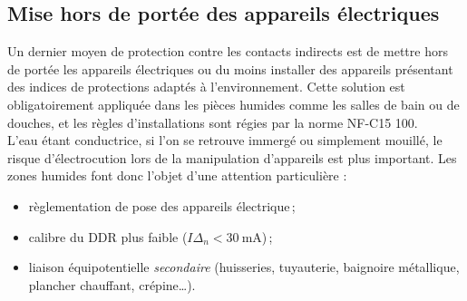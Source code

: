 

\subsection{Mise hors de portée des appareils électriques}

Un dernier moyen de protection contre les contacts indirects est de mettre hors de portée les appareils électriques ou du moins installer des appareils présentant des indices de protections adaptés à l'environnement. Cette solution est obligatoirement appliquée dans les pièces humides comme les salles de bain ou de douches, et les règles d'installations sont régies par la norme NF-C15 100\supercite{NF:C15-100-2015}.\\
L'eau étant conductrice, si l'on se retrouve immergé ou simplement mouillé, le risque d'électrocution lors de la manipulation d'appareils est plus important. Les zones humides font donc l'objet d'une attention particulière :
\begin{itemize}
\item règlementation de pose des appareils électrique\,;
\item calibre du DDR plus faible ($I\Delta_n<\SI{30}{\milli\ampere}$)\,;
\item liaison équipotentielle \emph{secondaire} (huisseries, tuyauterie, baignoire métallique, plancher chauffant, crépine\ldots).
\end{itemize}




